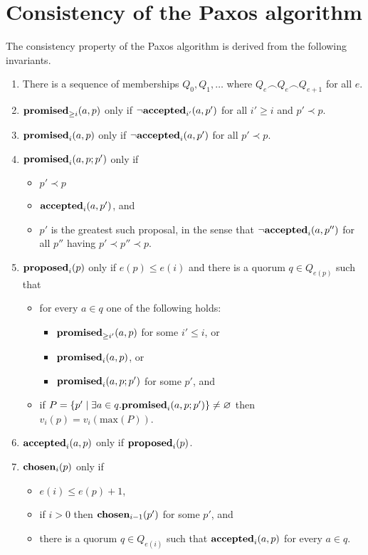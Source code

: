 \documentclass[journal]{IEEEtran}
\begin{document}
\section{Consistency of the Paxos algorithm}

The consistency property of the Paxos algorithm is derived from the following
invariants.

\begin{enumerate}

\item\label{paxos-quorums} There is a sequence of memberships $Q_0, Q_1,
\ldots$ where ${Q_e \frown Q_e \frown Q_{e+1}}$ for all $e$.

\item\label{paxos-mprom} $\mathbf{promised}_{\ge i}(a,p)$ only if $\neg\mathbf{accepted}_{i'}(a,p')$ for all
$i' \ge i$ and $p' \prec p$.

\item\label{paxos-fprom} $\mathbf{promised}_{i}(a,p)$ only if $\neg\mathbf{accepted}_{i}(a,p')$ for all
$p' \prec p$.

\item\label{paxos-bprom} $\mathbf{promised}_{i}(a,p;p')$ only if \begin{itemize} \item
$p' \prec p$ \item $\mathbf{accepted}_{i}(a,p')$, and \item $p'$ is the greatest such
proposal, in the sense that $\neg \mathbf{accepted}_{i}(a,p'')$ for all $p''$ having $p'
\prec p'' \prec p$. \end{itemize}

\item\label{paxos-prop} $\mathbf{proposed}_{i}(p)$ only if $e(p) \le e(i)$ and there is a
quorum $q \in Q_{e(p)}$ such that
\begin{itemize}
\item for every $a \in q$ one of the following holds:
%
\begin{itemize}
\item $\mathbf{promised}_{\ge i'}(a,p)$ for some $i' \le i$, or
\item $\mathbf{promised}_{i}(a,p)$, or
\item $\mathbf{promised}_{i}(a,p;p')$ for some $p'$, and
\end{itemize}

\item if $P = \{ p' \mid \exists a \in q. \mathbf{promised}_{i}(a,p;p') \}
\ne \varnothing$ then $v_i(p) = v_i(\mathrm{max}(P))$.
\end{itemize}

\item \label{paxos-acc} $\mathbf{accepted}_{i}(a,p)$ only if $\mathbf{proposed}_{i}(p)$.

\item \label{paxos-chosen} $\mathbf{chosen}_{i}(p)$ only if
\begin{itemize}
\item $e(i) \le e(p) + 1$,
\item if $i > 0$ then $\mathbf{chosen}_{i-1}(p')$ for some $p'$, and
\item there is a quorum $q \in
Q_{e(i)}$ such that $\mathbf{accepted}_{i}(a,p)$ for every $a \in q$.
\end{itemize}

\end{enumerate}
\end{document}
